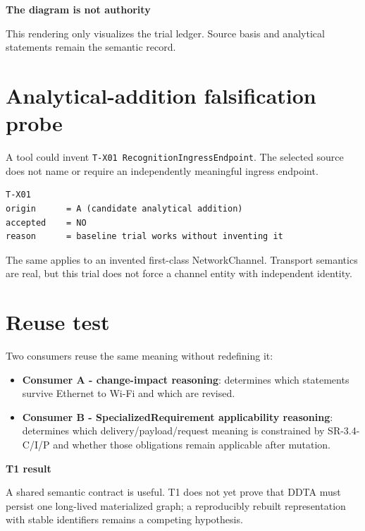 \documentclass[10pt,a4paper]{article}
\newenvironment{resultbox}[1]{\def\FrameCommand{\fcolorbox{ddtagreen}{ddtagray}}\MakeFramed{\advance\hsize-2\width\FrameRestore}\noindent\textbf{#1}\par\smallskip}{\endMakeFramed}
\newenvironment{warningbox}[1]{\def\FrameCommand{\fcolorbox{ddtared}{ddtagray}}\MakeFramed{\advance\hsize-2\width\FrameRestore}\noindent\textbf{#1}\par\smallskip}{\endMakeFramed}
\begin{document}
\begin{warningbox}{The diagram is not authority}
This rendering only visualizes the trial ledger. Source basis and analytical statements remain the semantic record.
\end{warningbox}

\section{Analytical-addition falsification probe}
A tool could invent \texttt{T-X01 RecognitionIngressEndpoint}. The selected source does not name or require an independently meaningful ingress endpoint.

\begin{lstlisting}
T-X01
origin      = A (candidate analytical addition)
accepted    = NO
reason      = baseline trial works without inventing it
\end{lstlisting}

The same applies to an invented first-class NetworkChannel. Transport semantics are real, but this trial does not force a channel entity with independent identity.

\section{Reuse test}
Two consumers reuse the same meaning without redefining it:

\begin{itemize}
\item \textbf{Consumer A - change-impact reasoning}: determines which statements survive Ethernet to Wi-Fi and which are revised.
\item \textbf{Consumer B - SpecializedRequirement applicability reasoning}: determines which delivery/payload/request meaning is constrained by SR-3.4-C/I/P and whether those obligations remain applicable after mutation.
\end{itemize}

\begin{resultbox}{T1 result}
A shared semantic contract is useful. T1 does not yet prove that DDTA must persist one long-lived materialized graph; a reproducibly rebuilt representation with stable identifiers remains a competing hypothesis.
\end{resultbox}
\end{document}
